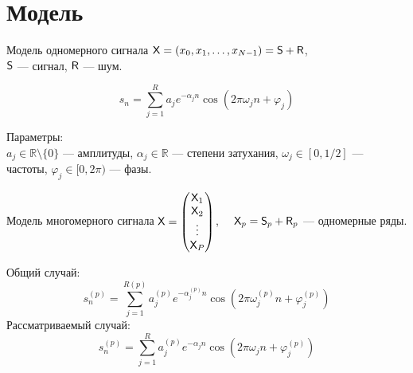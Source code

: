 \documentclass[ucs, notheorems, handout]{beamer}
\begin{document}
    \section{Модель}\label{sec:model}
    \begin{frame}{Модель одномерного сигнала}
        $\mathsf{X} = (x_0, x_1, \ldots, x_{N-1}) = \mathsf{S} + \mathsf{R}$,\\
        $\mathsf{S}$ --- сигнал, $\mathsf{R}$ --- шум.

        \vspace{0.4cm}

        \[
            s_n = \sum_{j=1}^{R} a_j e^{ -\alpha_j n }
            \cos\left( 2 \pi \omega_j n + \varphi_j\right)
        \]

        \vspace{0.3cm}
        Параметры:\\
        $a_j \in \mathbb{R}\setminus\{0\}$ --- амплитуды, $\alpha_j \in \mathbb{R}$ --- степени затухания,
        $\omega_j \in [0, 1/2]$ --- частоты, $\varphi_j \in [0, 2\pi)$ --- фазы.

    \end{frame}

    \begin{frame}{Модель многомерного сигнала}
        $\mathsf{X} =
        \begin{pmatrix}
            \mathsf{X}_1  \\
            \mathsf{X}_2  \\
            \vdots \\
            \mathsf{X}_P
        \end{pmatrix}
        $, $\quad\mathsf{X}_p = \mathsf{S}_p + \mathsf{R}_p$ --- одномерные ряды.

        \vspace{0.4cm}
        Общий случай:
        \[
            s_n^{(p)} = \sum_{j=1}^{R(p)} a_j^{(p)} e^{ -\alpha_j^{(p)} n }
            \cos\left( 2 \pi \omega_j^{(p)} n + \varphi_j^{(p)}\right)
        \]
        Рассматриваемый случай:
        \[
            s_n^{(p)} = \sum_{j=1}^{R} a_j^{(p)} e^{ -\alpha_j n }
            \cos\left( 2 \pi \omega_j n + \varphi_j^{(p)}\right)
        \]
    \end{frame}
\end{document}
